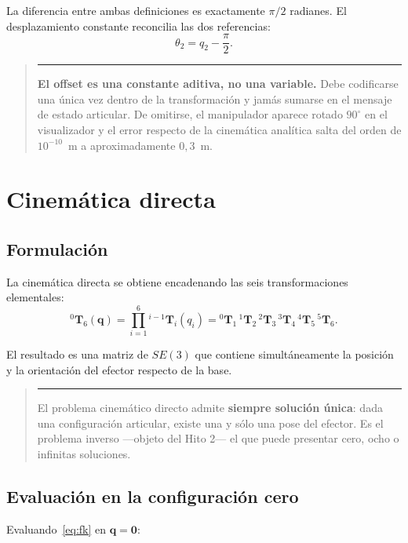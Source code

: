 \documentclass[11pt,a4paper]{article}
\newcommand{\T}[2]{{}^{#1}\mathbf{T}_{#2}}
\newcommand{\mat}[1]{\mathbf{#1}}
\newenvironment{nota}
  {\begin{quote}\small\color{oscuro}\rule{2pt}{\baselineskip}\hspace{6pt}\ignorespaces}
  {\end{quote}}
\begin{document}
La diferencia entre ambas definiciones es exactamente $\pi/2$ radianes.
El desplazamiento constante reconcilia las dos referencias:
\begin{equation}
\theta_2 = q_2 - \frac{\pi}{2}.
\end{equation}

\begin{nota}
\textbf{El offset es una constante aditiva, no una variable.} Debe
codificarse una única vez dentro de la transformación y jamás sumarse en
el mensaje de estado articular. De omitirse, el manipulador aparece
rotado $90^\circ$ en el visualizador y el error respecto de la
cinemática analítica salta del orden de $10^{-10}$~m a
aproximadamente $0{,}3$~m.
\end{nota}

\section{Cinemática directa}

\subsection{Formulación}

La cinemática directa se obtiene encadenando las seis transformaciones
elementales:
\begin{equation}
\T{0}{6}(\mat{q}) = \prod_{i=1}^{6} \T{i-1}{i}(q_i)
= \T{0}{1}\,\T{1}{2}\,\T{2}{3}\,\T{3}{4}\,\T{4}{5}\,\T{5}{6}.
\label{eq:fk}
\end{equation}

El resultado es una matriz de $SE(3)$ que contiene simultáneamente la
posición y la orientación del efector respecto de la base.

\begin{nota}
El problema cinemático directo admite \textbf{siempre solución única}:
dada una configuración articular, existe una y sólo una pose del
efector. Es el problema inverso —objeto del Hito 2— el que puede
presentar cero, ocho o infinitas soluciones.
\end{nota}

\subsection{Evaluación en la configuración cero}

Evaluando~\eqref{eq:fk} en $\mat{q} = \mat{0}$:
\end{document}

